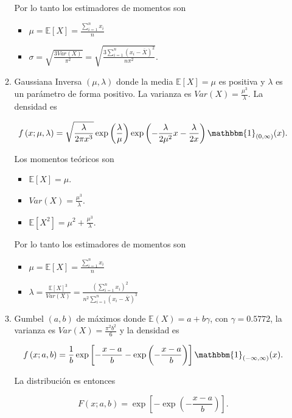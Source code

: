 \documentclass[letterpaper]{article}
\theoremstyle{definition}
\theoremstyle{lemathm}
\theoremstyle{lemathm}
\theoremstyle{lemathm}
\theoremstyle{lemademthm}
\newcommand{\pars}[1]{\left( #1 \right) }
\newcommand{\bracs}[1]{\left[ #1 \right] }
\newcommand{\EE}{\mathbb{E}}
\newcommand{\1}{\mathbbm{1}}
\begin{document}
\begin{enumerate}
\begin{enumerate}
			Por lo tanto los estimadores de momentos son

			\begin{itemize}
				\item $\mu = \EE\bracs{X} = \frac{\sum_{i=1}^n x_i}{n}$
				\item $\sigma = \sqrt{\frac{3Var\pars{X}}{\pi^2}} = \sqrt{\frac{3\sum_{i=1}^n \pars{x_i-\overline{X}}^2}{n\pi^2}}$.
			\end{itemize}

			\item Gaussiana Inversa $\pars{\mu,\lambda}$ donde la media $\EE\bracs{X} = \mu$ es positiva y $\lambda$ es un parámetro de forma positivo. La varianza es $Var\pars{X} = \frac{\mu^3}{\lambda}$. La densidad es
			
			\[f\pars{x;\mu,\lambda} = \sqrt{\frac{\lambda}{2\pi x^3}}\exp\pars{\frac{\lambda}{\mu}}\exp\pars{-\frac{\lambda}{2\mu^2}x - \frac{\lambda}{2x}}\1_{\pars{0,\infty}}(x).\]

			Los momentos teóricos son

			\begin{itemize}
				\item $\EE\bracs{X} = \mu$.
				\item $Var\pars{X} = \frac{\mu^3}{\lambda}$.
				\item $\EE\bracs{X^2} = \mu^2 + \frac{\mu^3}{\lambda}$.
			\end{itemize}

			Por lo tanto los estimadores de momentos son

			\begin{itemize}
				\item $\mu = \EE\bracs{X} = \frac{\sum_{i=1}^n x_i}{n}$
				\item $\lambda = \frac{\EE\bracs{X}^3}{Var\pars{X}} = \frac{\pars{\sum_{i=1}^n x_i}^2}{n^2\sum_{i=1}^n \pars{x_i-\overline{X}}^3}$
			\end{itemize}

			\item Gumbel $\pars{a,b}$ de máximos donde $\EE\pars{X} = a + b\gamma$, con $\gamma = 0.5772$, la varianza es $Var\pars{X} = \frac{\pi^2b^2}{6}$ y la densidad es
			
			\[f\pars{x; a,b} = \frac{1}{b}\exp\bracs{-\frac{x-a}{b}-\exp\pars{-\frac{x-a}{b}}}\1_{\pars{-\infty,\infty}}(x).\]

			La distribución es entonces

			\[F(x; a,b) = \exp\bracs{-\exp\pars{-\frac{x-a}{b}}}.\]


\end{enumerate}
\end{enumerate}
\end{document}
